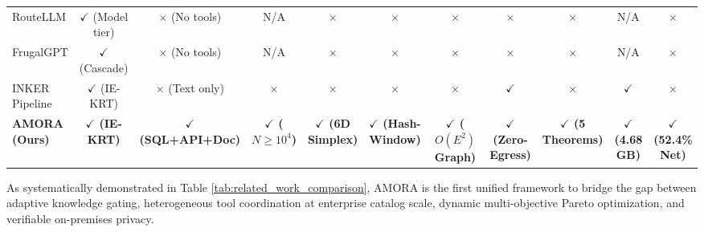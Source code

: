 \begin{table}[t]
{\begin{tabular}{lcccccccccc}
RouteLLM \cite{ong2024routellm} & $\checkmark$ (Model tier) & $\times$ (No tools) & N/A & $\times$ & $\times$ & $\times$ & $\times$ & $\times$ & N/A & $\times$ \\
FrugalGPT \cite{chen2023frugalgpt} & $\checkmark$ (Cascade) & $\times$ (No tools) & N/A & $\times$ & $\times$ & $\times$ & $\times$ & $\times$ & N/A & $\times$ \\
INKER Pipeline \cite{inker2024} & $\checkmark$ (IE-KRT) & $\times$ (Text only) & $\times$ & $\times$ & $\times$ & $\times$ & $\checkmark$ & $\times$ & $\checkmark$ & $\times$ \\
\midrule
\textbf{AMORA (Ours)} & \textbf{$\checkmark$ (IE-KRT)} & \textbf{$\checkmark$ (SQL+API+Doc)} & \textbf{$\checkmark$ ($N \ge 10^4$)} & \textbf{$\checkmark$ (6D Simplex)} & \textbf{$\checkmark$ (Hash-Window)} & \textbf{$\checkmark$ ($O(E^2)$ Graph)} & \textbf{$\checkmark$ (Zero-Egress)} & \textbf{$\checkmark$ (5 Theorems)} & \textbf{$\checkmark$ (4.68 GB)} & \textbf{$\checkmark$ (52.4\% Net)} \\
\bottomrule
\end{tabular}
}
\end{table}

As systematically demonstrated in Table \ref{tab:related_work_comparison}, AMORA is the first unified framework to bridge the gap between adaptive knowledge gating, heterogeneous tool coordination at enterprise catalog scale, dynamic multi-objective Pareto optimization, and verifiable on-premises privacy.
